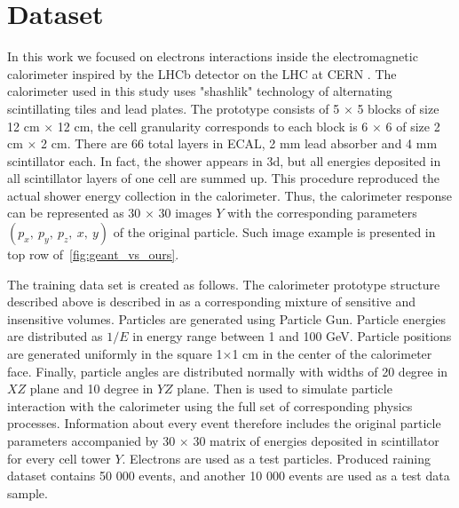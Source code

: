 \section{Dataset}
In this work we focused on electrons interactions inside the electromagnetic calorimeter inspired by the LHCb detector on the LHC at CERN \cite{Alves:2008zz} . The calorimeter used in this study uses "shashlik" technology of alternating scintillating tiles and lead plates. The prototype  consists of 5 $\times$ 5 blocks of size 12 cm $\times$ 12 cm, the cell granularity corresponds to each block is 6 $\times$ 6 of size 2 cm $\times$ 2 cm. There are 66 total layers in ECAL, 2 mm lead absorber and 4 mm scintillator each. In fact, the shower appears in 3d, but all energies deposited in all scintillator layers of one cell are summed up. This procedure reproduced the actual shower energy collection in the calorimeter. Thus, the calorimeter response can be represented as 30 $\times$ 30 images $Y$ with the corresponding parameters $(p_x,~ p_y,~ p_z,~ x,~ y)$ of the original particle. Such image example is presented in top row of~\cref{fig:geant_vs_ours}.

The training data set is created as follows. The calorimeter prototype structure described above is described in \geant as a corresponding mixture of sensitive and insensitive volumes. Particles are generated using Particle Gun. Particle energies are distributed as $1/E$ in energy range between 1 and 100 GeV. Particle positions are generated uniformly in the square 1$\times$1 cm in the center of the calorimeter face. Finally, particle angles are distributed normally with widths of 20 degree in $XZ$ plane and 10 degree in $YZ$ plane. Then \geant  is used to simulate particle interaction with the calorimeter using the full set of corresponding physics processes. Information about every event therefore includes the original particle parameters accompanied by 30 $\times$ 30 matrix of energies deposited in scintillator for every cell tower $Y$. Electrons are used as a test particles. Produced raining dataset contains 50 000 events, and another 10 000 events are used as a  test data sample.
